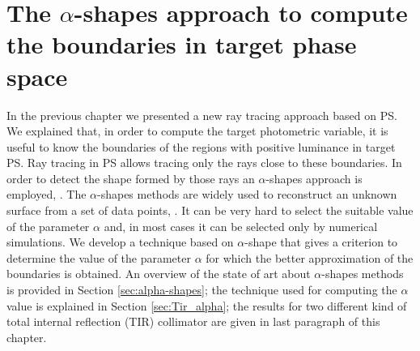 \chapter{The $\alpha$-shapes approach to compute the boundaries in target phase space}\label{chap:boundaries_alpha}
In the previous chapter we presented a new ray tracing approach based on PS. We explained that, in order to compute the target photometric variable, it is useful to know the boundaries of the regions with positive luminance in target PS. Ray tracing in PS allows tracing only the rays close to these boundaries. 
In order to detect the shape formed by those rays an $\alpha$-shapes approach is employed, \cite{portegies2013fast}. 
The $\alpha$-shapes methods are widely used to reconstruct an unknown surface from a set of data points, \cite{guo1997surface}. 
It can be very hard to select the suitable value of the parameter $\alpha$ and, in most cases it can be selected only by numerical simulations.
We develop a technique based on $\alpha$-shape that gives a criterion to determine the value of the parameter $\alpha$ for which the better approximation of the boundaries is obtained.  An overview of the state of art about $\alpha$-shapes methods is provided in Section \ref{sec:alpha-shapes}; the technique used for computing the $\alpha$ value is explained in Section \ref{sec:Tir_alpha}; the results for two different kind of total internal reflection (TIR) collimator are given in last paragraph of this chapter.
